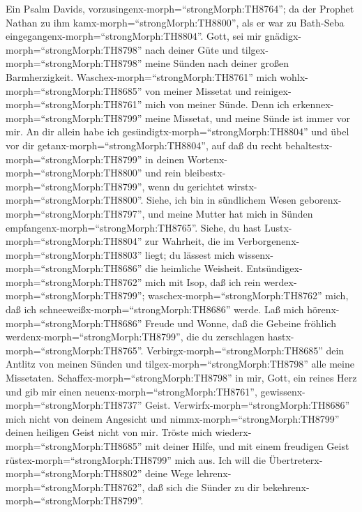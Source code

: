  Ein Psalm Davids,
vorzusingenx-morph=``strongMorph:TH8764''; da der Prophet Nathan zu ihm
kamx-morph=``strongMorph:TH8800'', als er war zu Bath-Seba
eingegangenx-morph=``strongMorph:TH8804''. Gott, sei mir
gnädigx-morph=``strongMorph:TH8798'' nach deiner Güte und
tilgex-morph=``strongMorph:TH8798'' meine Sünden nach deiner großen
Barmherzigkeit.  Waschex-morph=``strongMorph:TH8761'' mich
wohlx-morph=``strongMorph:TH8685'' von meiner Missetat und
reinigex-morph=``strongMorph:TH8761'' mich von meiner Sünde.
 Denn ich erkennex-morph=``strongMorph:TH8799'' meine
Missetat, und meine Sünde ist immer vor mir.  An dir allein
habe ich gesündigtx-morph=``strongMorph:TH8804'' und übel vor dir
getanx-morph=``strongMorph:TH8804'', auf daß du recht
behaltestx-morph=``strongMorph:TH8799'' in deinen
Wortenx-morph=``strongMorph:TH8800'' und rein
bleibestx-morph=``strongMorph:TH8799'', wenn du gerichtet
wirstx-morph=``strongMorph:TH8800''.  Siehe, ich bin in
sündlichem Wesen geborenx-morph=``strongMorph:TH8797'', und meine Mutter
hat mich in Sünden empfangenx-morph=``strongMorph:TH8765''. 
Siehe, du hast Lustx-morph=``strongMorph:TH8804'' zur Wahrheit, die im
Verborgenenx-morph=``strongMorph:TH8803'' liegt; du lässest mich
wissenx-morph=``strongMorph:TH8686'' die heimliche Weisheit.
 Entsündigex-morph=``strongMorph:TH8762'' mich mit Isop, daß
ich rein werdex-morph=``strongMorph:TH8799'';
waschex-morph=``strongMorph:TH8762'' mich, daß ich
schneeweißx-morph=``strongMorph:TH8686'' werde.  Laß mich
hörenx-morph=``strongMorph:TH8686'' Freude und Wonne, daß die Gebeine
fröhlich werdenx-morph=``strongMorph:TH8799'', die du zerschlagen
hastx-morph=``strongMorph:TH8765''. 
Verbirgx-morph=``strongMorph:TH8685'' dein Antlitz von meinen Sünden und
tilgex-morph=``strongMorph:TH8798'' alle meine Missetaten. 
Schaffex-morph=``strongMorph:TH8798'' in mir, Gott, ein reines Herz und
gib mir einen neuenx-morph=``strongMorph:TH8761'',
gewissenx-morph=``strongMorph:TH8737'' Geist. 
Verwirfx-morph=``strongMorph:TH8686'' mich nicht von deinem Angesicht
und nimmx-morph=``strongMorph:TH8799'' deinen heiligen Geist nicht von
mir.  Tröste mich wiederx-morph=``strongMorph:TH8685'' mit
deiner Hilfe, und mit einem freudigen Geist
rüstex-morph=``strongMorph:TH8799'' mich aus.  Ich will die
Übertreterx-morph=``strongMorph:TH8802'' deine Wege
lehrenx-morph=``strongMorph:TH8762'', daß sich die Sünder zu dir
bekehrenx-morph=``strongMorph:TH8799''. 

